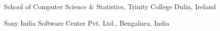 
{School of Computer Science \& Statistics,
Trinity College Dulin, Ireland}

\divider

{Sony India Software Center Pvt. Ltd., Bengaluru, India}
